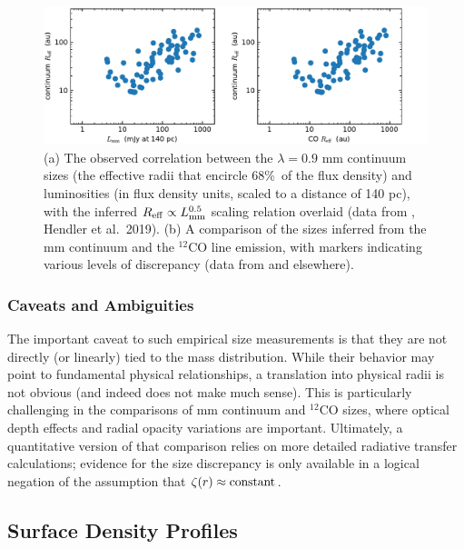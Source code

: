 \documentclass[a4paper]{ar-1col}
\begin{document}
\begin{figure}[t]
\includegraphics[width=\textwidth]{sizes.pdf}
\caption{(a) The observed correlation between the $\lambda = 0.9$ mm continuum sizes (the effective radii that encircle 68\%\ of the flux density) and luminosities (in flux density units, scaled to a distance of 140 pc), with the inferred $R_{\rm eff} \propto L_{\rm mm}^{0.5}$ scaling relation overlaid (data from \citealt{tripathi17,andrews18}, Hendler et al.~2019).  (b) A comparison of the sizes inferred from the mm continuum and the $^{12}$CO line emission, with markers indicating various levels of discrepancy (data from \citealt{ansdell18} and elsewhere).}
\label{fig:sizes}
\end{figure}


\subsubsection{Caveats and Ambiguities}
The important caveat to such empirical size measurements is that they are not directly (or linearly) tied to the mass distribution.  While their behavior may point to fundamental physical relationships, a translation  into physical radii is not obvious (and indeed does not make much sense).  This is particularly challenging in the comparisons of mm continuum and $^{12}$CO sizes, where optical depth effects and radial opacity variations are important.  Ultimately, a quantitative version of that comparison relies on more detailed radiative transfer calculations; evidence for the size discrepancy is only available in a logical negation of the assumption that $\zeta(r) \approx {\rm constant}$.    



\subsection{Surface Density Profiles} \label{sec:sigma}
\end{document}
